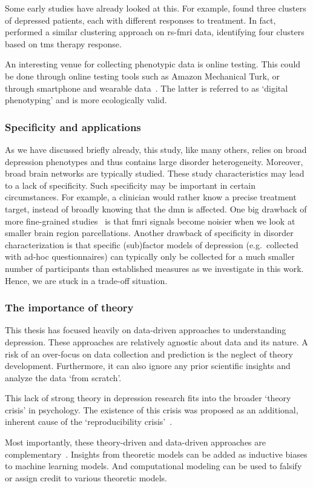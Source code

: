 Some early studies have already looked at this.
For example, \textcite{Chekroud2017} found three clusters of depressed patients, each with different responses to treatment.
In fact, \textcite{Drysdale2017} performed a similar clustering approach on \gls{rs-fmri} data, identifying four clusters based on \gls{tms} therapy response.

An interesting venue for collecting phenotypic data is online testing.
This could be done through online testing tools such as Amazon Mechanical Turk, or through smartphone and wearable data~\parencite[see e.g.][]{Shapiro2013, Brown2014b}.
The latter is referred to as `digital phenotyping' and is more ecologically valid.

\subsubsection{Specificity and applications}

As we have discussed briefly already, this study, like many others, relies on broad depression phenotypes and thus contains large disorder heterogeneity.
Moreover, broad brain networks are typically studied.
These study characteristics may lead to a lack of specificity.
Such specificity may be important in certain circumstances.
For example, a clinician would rather know a precise treatment target, instead of broadly knowing that the \gls{dmn} is affected.
One big drawback of more fine-grained studies~\parencite[e.g.][]{Klein-Flamp2022} is that \gls{fmri} signals become noisier when we look at smaller brain region parcellations.
Another drawback of specificity in disorder characterization is that specific (sub)factor models of depression (e.g.~collected with ad-hoc questionnaires) can typically only be collected for a much smaller number of participants than established measures as we investigate in this work.
Hence, we are stuck in a trade-off situation.

\subsubsection{The importance of theory}

This thesis has focused heavily on data-driven approaches to understanding depression.
These approaches are relatively agnostic about data and its nature.
A risk of an over-focus on data collection and prediction is the neglect of theory development.
Furthermore, it can also ignore any prior scientific insights and analyze the data `from scratch'.

This lack of strong theory in depression research fits into the broader `theory crisis' in psychology.
The existence of this crisis was proposed as an additional, inherent cause of the `reproducibility crisis'~\parencite{Oberauer2019, Eronen2021}.

Most importantly, these theory-driven and data-driven approaches are complementary~\parencite{Huys2016}.
Insights from theoretic models can be added as inductive biases to machine learning models.
And computational modeling can be used to falsify or assign credit to various theoretic models.
